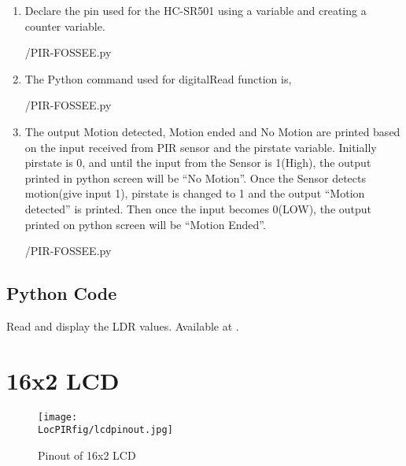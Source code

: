 \begin{enumerate}
  \item Declare the pin used for the HC-SR501 using a variable and creating a counter variable. 
        
        {\LocPIRpycode/PIR-FOSSEE.py} 
 \item The Python command used for digitalRead function is, 
        
        {\LocPIRpycode/PIR-FOSSEE.py} 
 \item The output Motion detected, Motion ended and No Motion are printed based on the input received      from PIR sensor and the pirstate variable. Initially pirstate is 0, and until the input from the Sensor is 1(High), the output printed in python screen will be “No Motion”. Once the Sensor detects motion(give input 1), pirstate is changed to 1 and the output “Motion detected” is printed. Then once the input becomes 0(LOW), the output printed on python screen will be “Motion Ended”.
        
        {\LocPIRpycode/PIR-FOSSEE.py} 

\end{enumerate}



\subsection{Python Code}
\label{sec:ldr-python-code}

\begin{pycode}
  {Read and display the LDR values.  Available at
    .}
  \label{py:ldr-read}
  
\end{pycode}



\section{16x2 LCD}
\begin{figure}[hpt]
  \centering
    \texttt{[image: \\LocPIRfig/lcdpinout.jpg]}
    \label{fig:pinlcd} \hfill
  \caption{Pinout of 16x2 LCD}
\end{figure} 

